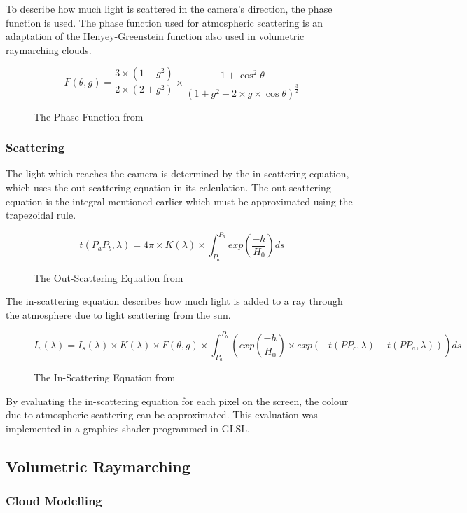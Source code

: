 \documentclass[10pt, openany]{book}
\begin{document}
To describe how much light is scattered in the camera's direction, the phase function is used. The phase function used for atmospheric scattering is an adaptation of the Henyey-Greenstein function also used in volumetric raymarching clouds.

\begin{figure}[H]
	\centering
	\[F(\theta,g) = \frac{3 \times (1 - g^2)}{2 \times (2 + g^2)} \times \frac{1 + \cos^2\theta}{(1 + g^2 - 2 \times g \times \cos\theta)^\frac{3}{2}}\]
	\caption{The Phase Function from \citep{gpugems2}}
\end{figure}

\subsubsection{Scattering}

The light which reaches the camera is determined by the in-scattering equation, which uses the out-scattering equation in its calculation. The out-scattering equation is the integral mentioned earlier which must be approximated using the trapezoidal rule.

\begin{figure}[H]
	\centering
	\[t(P_aP_b,\lambda) = 4\pi \times K(\lambda) \times \int_{P_a}^{P_b} exp(\frac{-h}{H_0}) ds \]
	\caption{The Out-Scattering Equation from \citep{gpugems2}}
\end{figure}

The in-scattering equation describes how much light is added to a ray through the atmosphere due to light scattering from the sun.

\begin{figure}[H]
	\centering
	\[I_v(\lambda) = I_s(\lambda) \times K(\lambda) \times F(\theta, g) \times \int_{P_a}^{P_b}(exp(\frac{-h}{H_0}) \times exp(-t(PP_c,\lambda) - t(PP_a,\lambda))) ds \]
	\caption{The In-Scattering Equation from \citep{gpugems2}}
\end{figure}

By evaluating the in-scattering equation for each pixel on the screen, the colour due to atmospheric scattering can be approximated. This evaluation was implemented in a graphics shader programmed in \Gls{GLSL}.

\subsection{Volumetric Raymarching}

\subsubsection{Cloud Modelling}
\end{document}
